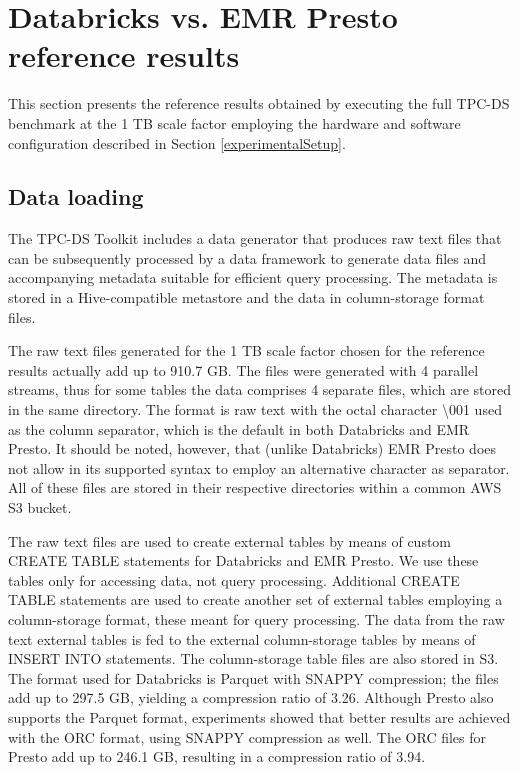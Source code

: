 \section{Databricks vs. EMR Presto reference results}\label{referenceResults}

This section presents the reference results obtained by executing the full TPC-DS benchmark at the 1 TB scale factor employing the hardware and software configuration described in Section \ref{experimentalSetup}.

\subsection{Data loading}\label{referenceResultsDataLoading}

The TPC-DS Toolkit includes a data generator that produces raw text files that can be subsequently processed by a data framework to generate data files and accompanying metadata suitable for efficient query processing. The metadata is stored in a Hive-compatible metastore and the data in column-storage format files.

The raw text files generated for the 1 TB scale factor chosen for the reference results actually add up to 910.7 GB. The files were generated with 4 parallel streams, thus for some tables the data comprises 4 separate files, which are stored in the same directory. The format is raw text with the octal character \textbackslash 001 used as the column separator, which is the default in both Databricks and EMR Presto. It should be noted, however, that (unlike Databricks) EMR Presto does not allow in its supported syntax to employ an alternative character as separator. All of these files are stored in their respective directories within a common AWS S3 bucket.

The raw text files are used to create external tables by means of custom CREATE TABLE statements for Databricks and EMR Presto. We use these tables only for accessing data, not query processing. Additional CREATE TABLE statements are used to create another set of external tables employing a column-storage format, these meant for query processing. The data from the raw text external tables is fed to the external column-storage tables by means of INSERT INTO statements. The column-storage table files are also stored in S3. The format used for Databricks is Parquet with SNAPPY compression; the files add up to 297.5 GB, yielding a compression ratio of 3.26. Although Presto also supports the Parquet format, experiments showed that better results are achieved with the ORC format, using SNAPPY compression as well. The ORC files for Presto add up to 246.1 GB, resulting in a compression ratio of 3.94.

